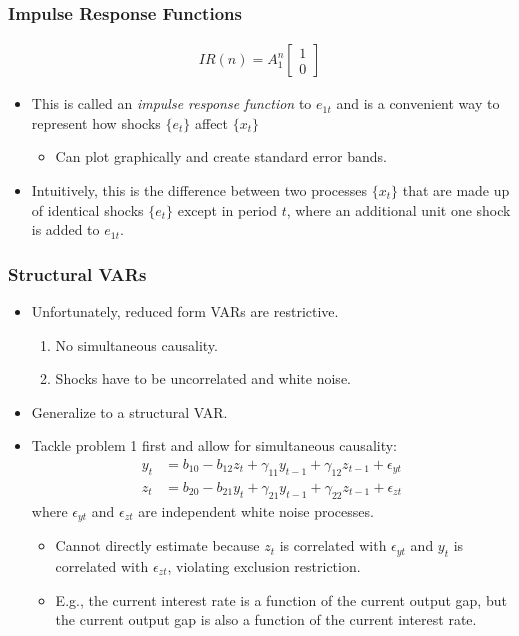 \documentclass[english,xcolor=svgnames]{beamer}
\begin{document}
\begin{frame}
\frametitle{Impulse Response Functions
}
\begin{align*}
	IR(n)=A_1^n \left[\begin{matrix}1 \\ 0\end{matrix}\right]
\end{align*}
\begin{itemize}
	\item This is called an \emph{impulse response function} to $e_{1t}$ and is a convenient way to represent how shocks  $\{e_{t}\}$ affect $\{x_{t}\}$
\begin{itemize}
	\item Can plot graphically and create standard error bands.
\end{itemize}
	\item Intuitively, this is the difference between two processes $\{x_t\}$ that are made up of identical shocks $\{e_t\}$ except in period $t$, where an additional unit one shock is added to $e_{1t}$.
\end{itemize}
\end{frame}


\begin{frame}
\frametitle{Structural VARs
}
\begin{itemize}
	\item Unfortunately, reduced form VARs are restrictive.
\begin{enumerate}[1.]
	\item No simultaneous causality.
	\item Shocks have to be uncorrelated and white noise.
\end{enumerate}
	\item Generalize to a structural VAR.
	\item Tackle problem 1 first and allow for simultaneous causality:
	\begin{align*}
		y_t &= b_{10}-b_{12}z_t + \gamma_{11}y_{t-1}+\gamma_{12}z_{t-1}+\epsilon_{yt} \\
		z_t &= b_{20}-b_{21}y_t + \gamma_{21}y_{t-1}+\gamma_{22}z_{t-1}+\epsilon_{zt}
	\end{align*}
	 where $\epsilon_{yt}$ and $\epsilon_{zt}$ are independent white noise processes.
	\begin{itemize}
		\item Cannot directly estimate because $z_t$ is correlated with $\epsilon_{yt}$ and $y_t$ is correlated with $\epsilon_{zt}$, violating exclusion restriction.
		\item E.g., the current interest rate is a function of the current output gap, but the current output gap is also a function of the current interest rate.
	\end{itemize}
\end{itemize}
\end{frame}
\end{document}
